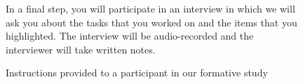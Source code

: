 \begin{figure}
\begin{mdframed}[backgroundcolor=gray!04]
\begin{footnotesize}
In a final step, you will participate in an interview in which we will ask you about the tasks that you worked on and the items that you highlighted. The interview will be audio-recorded and the interviewer will take written notes. \medskip



\end{footnotesize}
\end{mdframed}
\caption{Instructions provided to a participant in our formative study}
\end{figure}

\vfill
